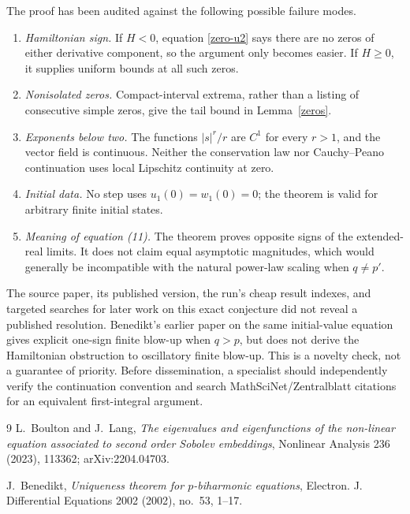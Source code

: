 \documentclass[11pt]{article}
\begin{document}
The proof has been audited against the following possible failure modes.
\begin{enumerate}
\item \emph{Hamiltonian sign.}  If $H<0$, equation \eqref{zero-u2} says
there are no zeros of either derivative component, so the argument only
becomes easier.  If $H\geq0$, it supplies uniform bounds at all such zeros.
\item \emph{Nonisolated zeros.}  Compact-interval extrema, rather than a
listing of consecutive simple zeros, give the tail bound in
Lemma~\ref{zeros}.
\item \emph{Exponents below two.}  The functions $|s|^r/r$ are $C^1$ for
every $r>1$, and the vector field is continuous.  Neither the conservation
law nor Cauchy--Peano continuation uses local Lipschitz continuity at zero.
\item \emph{Initial data.}  No step uses $u_1(0)=w_1(0)=0$; the theorem is
valid for arbitrary finite initial states.
\item \emph{Meaning of equation (11).}  The theorem proves opposite signs
of the extended-real limits.  It does not claim equal asymptotic magnitudes,
which would generally be incompatible with the natural power-law scaling
when $q\ne p'$.
\end{enumerate}

The source paper, its published version, the run's cheap result indexes, and
targeted searches for later work on this exact conjecture did not reveal a
published resolution.  Benedikt's earlier paper on the same initial-value
equation gives explicit one-sign finite blow-up when $q>p$, but does not
derive the Hamiltonian obstruction to oscillatory finite blow-up.  This is a
novelty check, not a guarantee of priority.  Before dissemination, a
specialist should independently verify the continuation convention and
search MathSciNet/Zentralblatt citations for an equivalent first-integral
argument.

\begin{thebibliography}{9}
L.~Boulton and J.~Lang,
\emph{The eigenvalues and eigenfunctions of the non-linear equation
associated to second order Sobolev embeddings},
Nonlinear Analysis 236 (2023), 113362; arXiv:2204.04703.

J.~Benedikt,
\emph{Uniqueness theorem for $p$-biharmonic equations},
Electron. J. Differential Equations 2002 (2002), no.~53, 1--17.
\end{thebibliography}
\end{document}
